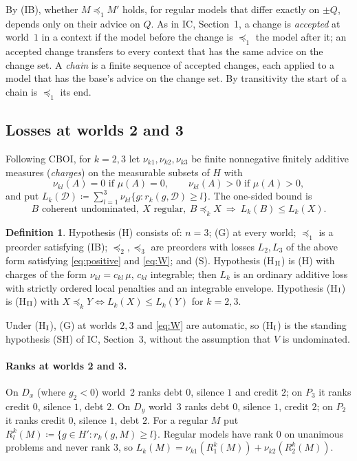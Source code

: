 \documentclass[11pt]{article}
\theoremstyle{definition}\newtheorem{definition}[theorem]{Definition}
\theoremstyle{remark}\newtheorem{remark}[theorem]{Remark}
\newcommand{\Dscr}{\mathcal D}
\begin{document}
By (IB), whether $M\preceq_1M'$ holds, for regular models that differ exactly
on $\pm Q$, depends only on their advice on $Q$. As in IC, Section~1, a change
is \emph{accepted} at world~$1$ in a context if the model before the change
is $\preceq_1$ the model after it; an accepted change transfers to every
context that has the same advice on the change set. A \emph{chain} is a
finite sequence of accepted changes, each applied to a model that has the
base's advice on the change set. By transitivity the start of a chain is
$\preceq_1$ its end.

\subsection{Losses at worlds 2 and 3}

Following CBOI, for $k=2,3$ let $\nu_{k1},\nu_{k2},\nu_{k3}$ be finite
nonnegative finitely additive measures (\emph{charges}) on the measurable
subsets of $H$ with
\begin{equation}
 \nu_{kl}(A)=0\text{ if }\mu(A)=0,\qquad\nu_{kl}(A)>0\text{ if }\mu(A)>0,
 \label{eq:positive}
\end{equation}
and put $L_k(\Dscr)\coloneqq\sum_{l=1}^3\nu_{kl}\{g:r_k(g,\Dscr)\ge l\}$. The
one-sided bound is
\begin{equation}
 B\text{ coherent undominated},\ X\text{ regular},\ B\preceq_kX
 \ \Longrightarrow\ L_k(B)\le L_k(X).
 \tag{W$_k$}\label{eq:W}
\end{equation}

\begin{definition}\label{def:H}
Hypothesis (H) consists of: $n=3$; (G) at every world; $\preceq_1$ is a
preorder satisfying (IB); $\preceq_2,\preceq_3$ are preorders with losses
$L_2,L_3$ of the above form satisfying \eqref{eq:positive} and
\eqref{eq:W}; and (S). Hypothesis (H$_{\rm II}$) is (H) with charges of the
form $\nu_{kl}=c_{kl}\,\mu$, $c_{kl}$ integrable; then $L_k$ is an ordinary
additive loss with strictly ordered local penalties and an integrable
envelope. Hypothesis (H$_{\rm I}$) is (H$_{\rm II}$) with
$X\preceq_kY\iff L_k(X)\le L_k(Y)$ for $k=2,3$.
\end{definition}

Under (H$_{\rm I}$), (G) at worlds $2,3$ and \eqref{eq:W} are automatic, so
(H$_{\rm I}$) is the standing hypothesis (SH) of IC, Section~3, without the
assumption that $V$ is undominated.

\paragraph{Ranks at worlds 2 and 3.} On $D_x$ (where $g_2<0$) world~$2$ ranks
debt $0$, silence $1$ and credit $2$; on $P_3$ it ranks credit $0$, silence
$1$, debt $2$. On $D_y$ world~$3$ ranks debt $0$, silence $1$, credit $2$; on
$P_2$ it ranks credit $0$, silence $1$, debt $2$. For a regular $M$ put
$R^k_l(M)\coloneqq\{g\in H':r_k(g,M)\ge l\}$. Regular models have rank $0$ on
unanimous problems and never rank $3$, so
$L_k(M)=\nu_{k1}(R^k_1(M))+\nu_{k2}(R^k_2(M))$.
\end{document}
